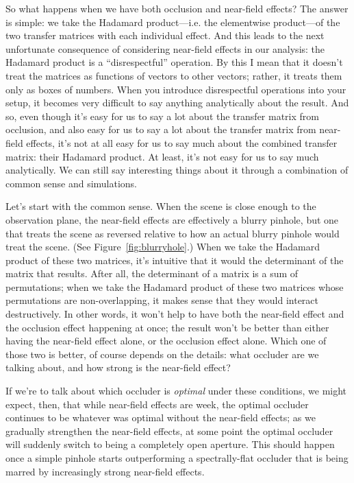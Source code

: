 So what happens when we have both occlusion and near-field effects? The answer is simple: we take the Hadamard product---i.e. the elementwise product---of the two transfer matrices with each individual effect. And this leads to the next unfortunate consequence of considering near-field effects in our analysis: the Hadamard product is a ``disrespectful'' operation. By this I mean that it doesn't treat the matrices as functions of vectors to other vectors; rather, it treats them only as boxes of numbers. When you introduce disrespectful operations into your setup, it becomes very difficult to say anything analytically about the result. And so, even though it's easy for us to say a lot about the transfer matrix from occlusion, and also easy for us to say a lot about the transfer matrix from near-field effects, it's not at all easy for us to say much about the combined transfer matrix: their Hadamard product. At least, it's not easy for us to say much analytically. We can still say interesting things about it through a combination of common sense and simulations.

Let's start with the common sense. When the scene is close enough to the observation plane, the near-field effects are effectively a blurry pinhole, but one that treats the scene as reversed relative to how an actual blurry pinhole would treat the scene. (See Figure~\ref{fig:blurryhole}.) When we take the Hadamard product of these two matrices, it's intuitive that it would the determinant of the matrix that results. After all, the determinant of a matrix is a sum of permutations; when we take the Hadamard product of these two matrices whose permutations are non-overlapping, it makes sense that they would interact destructively. In other words, it won't help to have both the near-field effect and the occlusion effect happening at once; the result won't be better than either having the near-field effect alone, or the occlusion effect alone. Which one of those two is better, of course depends on the details: what occluder are we talking about, and how strong is the near-field effect? 

If we're to talk about which occluder is \emph{optimal} under these conditions, we might expect, then, that while near-field effects are week, the optimal occluder continues to be whatever was optimal without the near-field effects; as we gradually strengthen the near-field effects, at some point the optimal occluder will suddenly switch to being a completely open aperture. This should happen once a simple pinhole starts outperforming a spectrally-flat occluder that is being marred by increasingly strong near-field effects.

